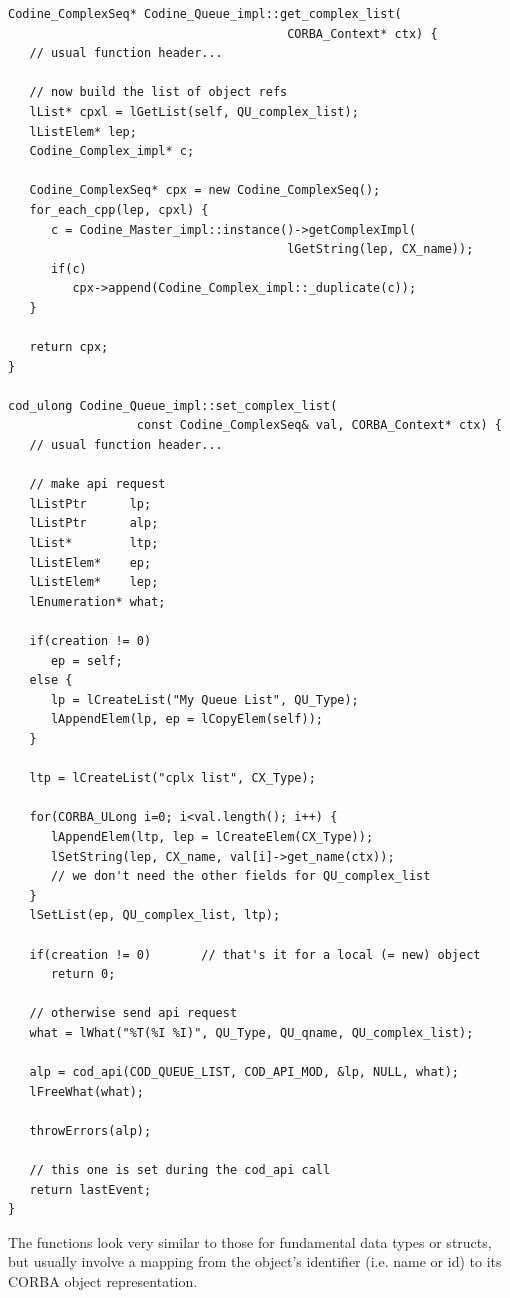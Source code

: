 \begin{Verbatim}[fontsize=\small, frame=single]
Codine_ComplexSeq* Codine_Queue_impl::get_complex_list(
                                       CORBA_Context* ctx) {
   // usual function header...

   // now build the list of object refs
   lList* cpxl = lGetList(self, QU_complex_list);
   lListElem* lep;
   Codine_Complex_impl* c;

   Codine_ComplexSeq* cpx = new Codine_ComplexSeq();
   for_each_cpp(lep, cpxl) {
      c = Codine_Master_impl::instance()->getComplexImpl(
                                       lGetString(lep, CX_name));
      if(c)
         cpx->append(Codine_Complex_impl::_duplicate(c));
   }
   
   return cpx;
}

cod_ulong Codine_Queue_impl::set_complex_list(
                  const Codine_ComplexSeq& val, CORBA_Context* ctx) {
   // usual function header...

   // make api request
   lListPtr      lp;
   lListPtr      alp;
   lList*        ltp;
   lListElem*    ep;
   lListElem*    lep;
   lEnumeration* what;
   
   if(creation != 0)
      ep = self;
   else {
      lp = lCreateList("My Queue List", QU_Type);
      lAppendElem(lp, ep = lCopyElem(self));
   }

   ltp = lCreateList("cplx list", CX_Type);

   for(CORBA_ULong i=0; i<val.length(); i++) {
      lAppendElem(ltp, lep = lCreateElem(CX_Type));
      lSetString(lep, CX_name, val[i]->get_name(ctx));
      // we don't need the other fields for QU_complex_list
   }
   lSetList(ep, QU_complex_list, ltp);

   if(creation != 0)       // that's it for a local (= new) object
      return 0; 

   // otherwise send api request
   what = lWhat("%T(%I %I)", QU_Type, QU_qname, QU_complex_list);
   
   alp = cod_api(COD_QUEUE_LIST, COD_API_MOD, &lp, NULL, what);
   lFreeWhat(what);

   throwErrors(alp); 

   // this one is set during the cod_api call
   return lastEvent;
}
\end{Verbatim}

The functions look very similar to those for fundamental data types or
structs, but usually involve a mapping from the object's identifier (i.e.
name or id) to its CORBA object representation.

